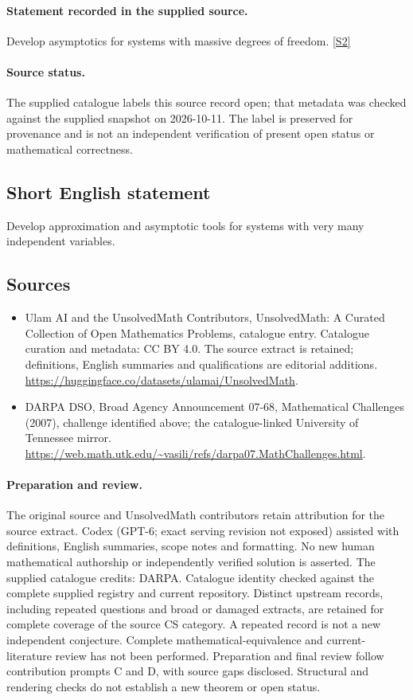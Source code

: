 \documentclass[11pt]{article}
\begin{document}
\paragraph{Statement recorded in the supplied source.}
Develop asymptotics for systems with massive degrees of freedom. \href{https://web.math.utk.edu/~vasili/refs/darpa07.MathChallenges.html}{[S2]}
\paragraph{Source status.}
The supplied catalogue labels this source record open; that metadata was checked against the supplied snapshot on 2026-10-11. The label is preserved for provenance and is not an independent verification of present open status or mathematical correctness.
\subsection{Short English statement}
Develop approximation and asymptotic tools for systems with very many independent variables.
\subsection{Sources}
\begin{itemize}
\item[S1] Ulam AI and the UnsolvedMath Contributors, UnsolvedMath: A Curated Collection of Open Mathematics Problems, catalogue entry. Catalogue curation and metadata: CC BY 4.0. The source extract is retained; definitions, English summaries and qualifications are editorial additions.
\url{https://huggingface.co/datasets/ulamai/UnsolvedMath}.
\item[S2] DARPA DSO, Broad Agency Announcement 07-68, Mathematical Challenges (2007), challenge identified above; the catalogue-linked University of Tennessee mirror.
\url{https://web.math.utk.edu/~vasili/refs/darpa07.MathChallenges.html}.
\end{itemize}
\paragraph{Preparation and review.}
The original source and UnsolvedMath contributors retain attribution for the source extract. Codex (GPT-6; exact serving revision not exposed) assisted with definitions, English summaries, scope notes and formatting. No new human mathematical authorship or independently verified solution is asserted. The supplied catalogue credits: DARPA. Catalogue identity checked against the complete supplied registry and current repository. Distinct upstream records, including repeated questions and broad or damaged extracts, are retained for complete coverage of the source CS category. A repeated record is not a new independent conjecture. Complete mathematical-equivalence and current-literature review has not been performed. Preparation and final review follow contribution prompts C and D, with source gaps disclosed. Structural and rendering checks do not establish a new theorem or open status.
\label{end:statement}
\end{document}
